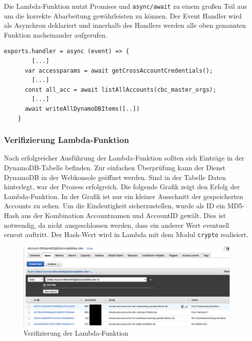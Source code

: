 Die Lambda-Funktion nutzt Promises und \verb+async/await+ zu einem großen Teil aus um die korrekte Abarbeitung gewährleisten zu können.
Der Event Handler wird als Asynchron deklariert und innerhalb des Handlers werden alle oben genannten Funktion nacheinander aufgerufen.

\begin{lstlisting}[basicstyle=\ttfamily\small, breaklines=true , frame = single, backgroundcolor=\color{lightgray}, caption={Beispiel zum asynchronen Funktionsaufruf (Datei: \textit{\nameref{lst:LambdaCode}})} ]
    exports.handler = async (event) => {
        [...]
      var accessparams = await getCrossAccountCredentials();
        [...]
      const all_acc = await listAllAccounts(cbc_master_orgs);
        [...]
      await writeAllDynamoDBItems([..])
    }
    \end{lstlisting}
\clearpage
\subsubsection{Verifizierung Lambda-Funktion}

Nach erfolgreicher Ausführung der Lambda-Funktion sollten sich Einträge in der DynamoDB-Tabelle befinden.
Zur einfachen Überprüfung kann der Dienst DynamoDB in der Webkonsole geöffnet werden.
Sind in der Tabelle Daten hinterlegt, war der Prozess erfolgreich.
Die folgende Grafik zeigt den Erfolg der Lambda-Funktion.
In der Grafik ist nur ein kleiner Ausschnitt der gespeicherten Accounts zu sehen.
Um die Eindeutigkeit sicherzustellen, wurde als ID ein MD5-Hash aus der Kombination Accountnamen und AccountID gewält.
Dies ist notwendig, da nicht ausgeschlossen werden, dass ein anderer Wert eventuell erneut auftritt.
Der Hash-Wert wird in Lambda mit dem Modul \verb+crypto+ realisiert.

\begin{figure}[htbp]
    \centering
    \includegraphics[width=1.0\textwidth]{50-Implementierung/DynamoWeb.png}
    \caption{Verifizierung der Lambda-Funktion}
    \label{fig:meine-grafik}
\end{figure}


